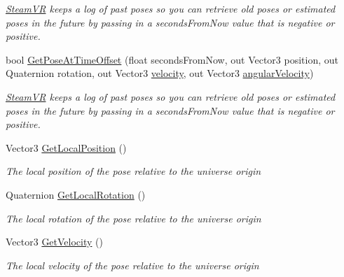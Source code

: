 \begin{DoxyCompactItemize}
\begin{DoxyCompactList}\small\item\em \mbox{\hyperlink{class_valve_1_1_v_r_1_1_steam_v_r}{Steam\+VR}} keeps a log of past poses so you can retrieve old poses or estimated poses in the future by passing in a seconds\+From\+Now value that is negative or positive. \end{DoxyCompactList}\item 
bool \mbox{\hyperlink{class_valve_1_1_v_r_1_1_steam_v_r___action___skeleton_a7b58460cbccf9e520d1463a20a7aaf67}{Get\+Pose\+At\+Time\+Offset}} (float seconds\+From\+Now, out Vector3 position, out Quaternion rotation, out Vector3 \mbox{\hyperlink{class_valve_1_1_v_r_1_1_steam_v_r___action___pose___base_aaf2089c742c29110276191454cda9c7a}{velocity}}, out Vector3 \mbox{\hyperlink{class_valve_1_1_v_r_1_1_steam_v_r___action___pose___base_a84bf81feaa02463f8151e1ea25e16825}{angular\+Velocity}})
\begin{DoxyCompactList}\small\item\em \mbox{\hyperlink{class_valve_1_1_v_r_1_1_steam_v_r}{Steam\+VR}} keeps a log of past poses so you can retrieve old poses or estimated poses in the future by passing in a seconds\+From\+Now value that is negative or positive. \end{DoxyCompactList}\item 
Vector3 \mbox{\hyperlink{class_valve_1_1_v_r_1_1_steam_v_r___action___skeleton_abb7252a97f4108bda5915954c10f32a7}{Get\+Local\+Position}} ()
\begin{DoxyCompactList}\small\item\em The local position of the pose relative to the universe origin \end{DoxyCompactList}\item 
Quaternion \mbox{\hyperlink{class_valve_1_1_v_r_1_1_steam_v_r___action___skeleton_a441c342e8cb29b52c7390279832bfdfa}{Get\+Local\+Rotation}} ()
\begin{DoxyCompactList}\small\item\em The local rotation of the pose relative to the universe origin \end{DoxyCompactList}\item 
Vector3 \mbox{\hyperlink{class_valve_1_1_v_r_1_1_steam_v_r___action___skeleton_a2081399c843bd653b32a04eb0944cb97}{Get\+Velocity}} ()
\begin{DoxyCompactList}\small\item\em The local velocity of the pose relative to the universe origin \end{DoxyCompactList}\item 

\end{DoxyCompactItemize}

